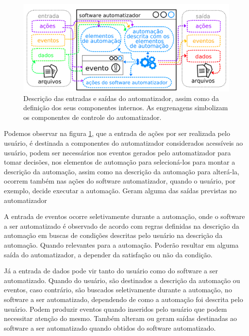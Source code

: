 \documentclass[tg]{mdtufsm}
\begin{document}
                \begin{figure}[!htb]
                    {\centering
                    \includegraphics[width=1.0\textwidth]{imagens/automatIO}
                    \caption{Descrição das entradas e saídas do automatizador, assim como da definição dos seus componentes internos. As engrenagens simbolizam os componentes de controle do automatizador.}
                    \label{fig:automatIO}}
                \end{figure}

                Podemos observar na figura \ref{fig:automatIO}, que a entrada de ações por ser realizada pelo usuário, é destinada a componentes do automatizador considerados acessíveis ao usuário, podem ser necessários nos eventos gerados pelo automatizador para tomar decisões, nos elementos de automação para selecioná-los para montar a descrição da automação, assim como na descrição da automação para alterá-la, ocorrem também nas ações do software automatizador, quando o usuário, por exemplo, decide executar a automação. Geram alguma das saídas previstas no automatizador

                A entrada de eventos ocorre seletivamente durante a automação, onde o software a ser automatizado é observado de acordo com regras definidas na descrição da automação em buscas de condições descritas pelo usuário na descrição da automação. Quando relevantes para a automação. Poderão resultar em alguma saída do automatizador, a depender da satisfação ou não da condição.

                Já a entrada de dados pode vir tanto do usuário como do software a ser automatizado. Quando do usuário, são destinados a descrição da automação ou eventos, caso contrário, são buscados seletivamente durante a automação, no software a ser automatizado, dependendo de como a automação foi descrita pelo usuário. Podem produzir eventos quando inseridos pelo usuário que podem necessitar atenção do mesmo. Também alteram ou geram saídas destinadas ao software a ser automatizado quando obtidos do software automatizado.
\end{document}
